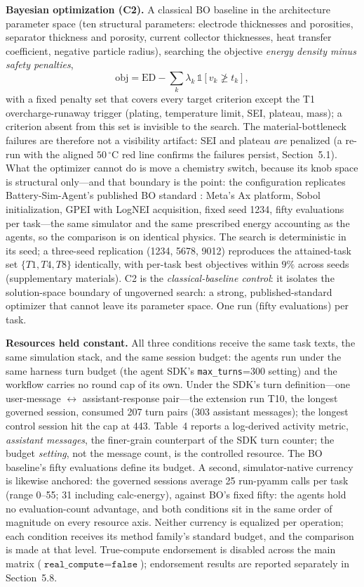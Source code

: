 \textbf{Bayesian optimization (C2).} A classical BO baseline in the
architecture parameter space (ten structural parameters: electrode
thicknesses and porosities, separator thickness and porosity, current
collector thicknesses, heat transfer coefficient, negative particle radius),
searching the objective \emph{energy density minus safety penalties},
\begin{equation}
\label{eq:bo}
\mathrm{obj} = \mathrm{ED} - \sum_{k} \lambda_k\, \mathbb{1}[v_k \not\geq t_k],
\end{equation}
with a fixed penalty set that covers every target criterion except the
T1 overcharge-runaway trigger (plating, temperature limit, SEI, plateau,
mass); a criterion absent from this set is invisible to the search. The
material-bottleneck failures are therefore not a visibility artifact: SEI
and plateau \emph{are} penalized (a re-run with the aligned $50\,^\circ$C
red line confirms the failures persist, Section~5.1). What the optimizer
cannot do is move a chemistry switch, because its knob space is
structural only---and that boundary is the point: the configuration
replicates Battery-Sim-Agent's published BO standard
\cite{chen2026battery}: Meta's Ax platform, Sobol initialization, GPEI with
LogNEI acquisition, fixed seed 1234, fifty evaluations per task---the same
simulator and the same prescribed energy accounting as the agents, so
the comparison is on identical physics. The search is deterministic in its
seed; a three-seed replication (1234, 5678, 9012) reproduces the attained-task
set $\{T1,T4,T8\}$ identically, with per-task best objectives within $9\%$
across seeds (supplementary materials). C2 is the \emph{classical-baseline
control}: it isolates the solution-space boundary of ungoverned search: a
strong, published-standard optimizer that cannot leave its parameter space.
One run (fifty evaluations) per task.

\textbf{Resources held constant.} All three conditions receive the same
task texts, the same simulation stack, and the same session budget: the
agents run under the same harness turn budget (the agent SDK's
\texttt{max\_turns}=300 setting) and the workflow carries no round cap of
its own. Under the SDK's turn definition---one user-message
$\leftrightarrow$ assistant-response pair---the extension run T10, the
longest governed session, consumed 207 turn pairs (303 assistant
messages); the longest control session hit the cap at 443. Table~4
reports a log-derived activity metric, \emph{assistant messages}, the
finer-grain counterpart of the SDK turn counter; the budget
\emph{setting}, not the message count, is the controlled resource. The
BO baseline's fifty evaluations define its budget. A second, simulator-native currency is likewise anchored: the
governed sessions average 25 run-pyamm calls per task (range 0--55; 31
including calc-energy), against BO's fixed fifty: the agents hold no
evaluation-count advantage, and both conditions sit in the same order of
magnitude on every resource axis. Neither currency is equalized per
operation; each condition receives its method family's standard budget, and
the comparison is made at that level. True-compute endorsement is disabled
across the main matrix
($\texttt{real\_compute}=\texttt{false}$); endorsement results are reported
separately in Section~5.8.

